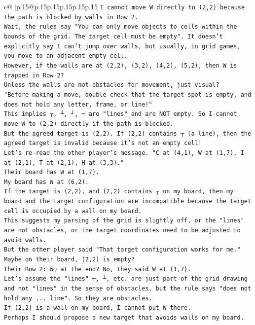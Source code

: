 \documentclass{article}
\begin{document}
{\begin{supertabular}{c@{$\;$}|p{.15\linewidth}@{}p{.15\linewidth}p{.15\linewidth}p{.15\linewidth}p{.15\linewidth}p{.15\linewidth}}
{{{\texttt{I cannot move W directly to (2,2) because the path is blocked by walls in Row 2.} \\
\texttt{Wait, the rules say "You can only move objects to cells within the bounds of the grid. The target cell must be empty". It doesn't explicitly say I can't jump over walls, but usually, in grid games, you move to an adjacent empty cell.} \\
\texttt{However, if the walls are at (2,2), (3,2), (4,2), (5,2), then W is trapped in Row 2?} \\
\texttt{Unless the walls are not obstacles for movement, just visual?} \\
\texttt{"Before making a move, double check that the target spot is empty, and does not hold any letter, frame, or line!"} \\
\texttt{This implies ┬, ┴, ┘, ─ are "lines" and are NOT empty. So I cannot move W to (2,2) directly if the path is blocked.} \\
\texttt{But the agreed target is (2,2). If (2,2) contains ┬ (a line), then the agreed target is invalid because it's not an empty cell!} \\
\texttt{Let's re{-}read the other player's message. "C at (4,1), W at (1,7), I at (2,1), T at (2,1), H at (3,3)."} \\
\texttt{Their board has W at (1,7).} \\
\texttt{My board has W at (6,2).} \\
\texttt{If the target is (2,2), and (2,2) contains ┬ on my board, then my board and the target configuration are incompatible because the target cell is occupied by a wall on my board.} \\
\texttt{This suggests my parsing of the grid is slightly off, or the "lines" are not obstacles, or the target coordinates need to be adjusted to avoid walls.} \\
\texttt{But the other player said "That target configuration works for me."} \\
\texttt{Maybe on their board, (2,2) is empty?} \\
\texttt{Their Row 2: W◌ at the end? No, they said W at (1,7).} \\
\texttt{Let's assume the "lines" ┬, ┴, etc. are just part of the grid drawing and not "lines" in the sense of obstacles, but the rule says "does not hold any ... line". So they are obstacles.} \\
\texttt{If (2,2) is a wall on my board, I cannot put W there.} \\
\texttt{Perhaps I should propose a new target that avoids walls on my board.} \\
}}}
\end{supertabular}}
\end{document}
